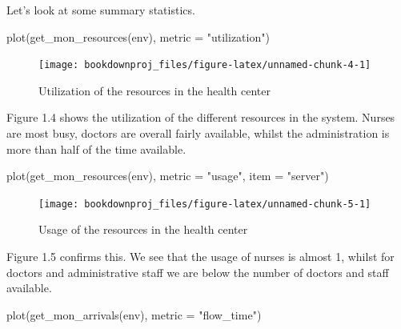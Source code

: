 \documentclass[
]{book}
\newenvironment{Shaded}{\begin{snugshade}}{\end{snugshade}}
\newcommand{\AttributeTok}[1]{\textcolor[rgb]{0.77,0.63,0.00}{#1}}
\newcommand{\FunctionTok}[1]{\textcolor[rgb]{0.00,0.00,0.00}{#1}}
\newcommand{\NormalTok}[1]{#1}
\newcommand{\StringTok}[1]{\textcolor[rgb]{0.31,0.60,0.02}{#1}}
\begin{document}
Let's look at some summary statistics.

\begin{Shaded}
\begin{Highlighting}[]
\FunctionTok{plot}\NormalTok{(}\FunctionTok{get\_mon\_resources}\NormalTok{(env), }\AttributeTok{metric =} \StringTok{"utilization"}\NormalTok{)}
\end{Highlighting}
\end{Shaded}

\begin{figure}

{\centering \texttt{[image: bookdownproj\_files/figure-latex/unnamed-chunk-4-1]} 

}

\caption{Utilization of the resources in the health center}\label{fig:unnamed-chunk-4}
\end{figure}

Figure 1.4 shows the utilization of the different resources in the system. Nurses are most busy, doctors are overall fairly available, whilst the administration is more than half of the time available.

\begin{Shaded}
\begin{Highlighting}[]
\FunctionTok{plot}\NormalTok{(}\FunctionTok{get\_mon\_resources}\NormalTok{(env), }\AttributeTok{metric =} \StringTok{"usage"}\NormalTok{, }\AttributeTok{item =} \StringTok{"server"}\NormalTok{)}
\end{Highlighting}
\end{Shaded}

\begin{figure}

{\centering \texttt{[image: bookdownproj\_files/figure-latex/unnamed-chunk-5-1]} 

}

\caption{Usage of the resources in the health center}\label{fig:unnamed-chunk-5}
\end{figure}

Figure 1.5 confirms this. We see that the usage of nurses is almost 1, whilst for doctors and administrative staff we are below the number of doctors and staff available.

\begin{Shaded}
\begin{Highlighting}[]
\FunctionTok{plot}\NormalTok{(}\FunctionTok{get\_mon\_arrivals}\NormalTok{(env), }\AttributeTok{metric =} \StringTok{"flow\_time"}\NormalTok{)}
\end{Highlighting}
\end{Shaded}
\end{document}
